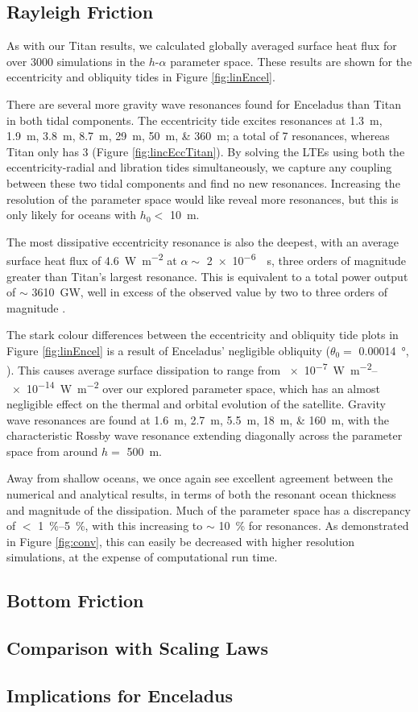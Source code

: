 \subsection{Rayleigh Friction}

As with our Titan results, we calculated globally averaged surface heat flux for over 3000 simulations in the $h$-$\alpha$ parameter space. These results are shown for the eccentricity and obliquity tides in Figure \ref{fig:linEncel}.

There are several more gravity wave resonances found for Enceladus than Titan in both tidal components. The eccentricity tide excites resonances at \SIlist{1.3;1.9;3.8;8.7;29;50;360}{m}; a total of 7 resonances, whereas Titan only has 3 (Figure \ref{fig:lincEccTitan}). By solving the LTEs using both the eccentricity-radial and libration tides simultaneously, we capture any coupling between these two tidal components and find no new resonances. Increasing the resolution of the parameter space would like reveal more resonances, but this is only likely for oceans with $h_0 <$ \SI{10}{\metre}. 

The most dissipative eccentricity resonance is also the deepest, with an average surface heat flux of \SI{4.6}{\watt\per\square\metre} at $\alpha\sim$ \SI{2e-6}{\per\second}, three orders of magnitude greater than Titan's largest resonance. This is equivalent to a total power output of $\sim$ \SI{3610}{\giga\watt}, well in excess of the observed value by two to three orders of magnitude \citep{spencer2006cassini}. 

The stark colour differences between the eccentricity and obliquity tide plots in Figure \ref{fig:linEncel} is a result of Enceladus' negligible obliquity ($\theta_0 =$ \SI{0.00014}{\degree}, \citep{chen2013tidal}). This causes average surface dissipation to range from \SIrange{e-7}{e-14}{\watt\per\square\metre} over our explored parameter space, which has an almost negligible effect on the thermal and orbital evolution of the satellite. Gravity wave resonances are found at \SIlist{1.6;2.7;5.5;18;160}{\metre}, with the characteristic Rossby wave resonance extending diagonally across the parameter space from around $h=$ \SI{500}{\metre}.

Away from shallow oceans, we once again see excellent agreement between the numerical and analytical results, in terms of both the resonant ocean thickness and magnitude of the dissipation. Much of the parameter space has a discrepancy of $<$ \SIrange{1}{5}{\percent}, with this increasing to $\sim$ \SI{10}{\percent} for resonances. As demonstrated in Figure \ref{fig:conv}, this can easily be decreased with higher resolution simulations, at the expense of computational run time.


\subsection{Bottom Friction}

\subsection{Comparison with Scaling Laws}

\subsection{Implications for Enceladus}